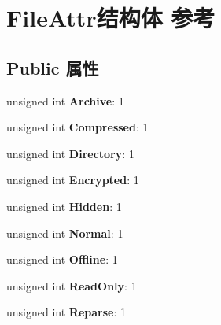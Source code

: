\hypertarget{struct_file_attr}{}\section{File\+Attr结构体 参考}
\label{struct_file_attr}
\subsection*{Public 属性}
\begin{DoxyCompactItemize}
\item 
\mbox{\label{struct_file_attr_a30e9959119e11f2c24c4fc2548688047}} 
unsigned int {\bfseries Archive}\+: 1
\item 
\mbox{\label{struct_file_attr_a1c08b9b2c14ce6c1f4360ea3cae6b5e6}} 
unsigned int {\bfseries Compressed}\+: 1
\item 
\mbox{\label{struct_file_attr_a44e6540f9d01bb250e250f70971de977}} 
unsigned int {\bfseries Directory}\+: 1
\item 
\mbox{\label{struct_file_attr_a8bd396764cdc285f31c85d743a3bd6b9}} 
unsigned int {\bfseries Encrypted}\+: 1
\item 
\mbox{\label{struct_file_attr_a5b22873632a5fc7c70e3e1d58879ab56}} 
unsigned int {\bfseries Hidden}\+: 1
\item 
\mbox{\label{struct_file_attr_a95b4d48b2684c8d3df376746f1aa2aa1}} 
unsigned int {\bfseries Normal}\+: 1
\item 
\mbox{\label{struct_file_attr_aed3eab684eaa0cf2d2a41444b5d64420}} 
unsigned int {\bfseries Offline}\+: 1
\item 
\mbox{\label{struct_file_attr_a79547e71b83cb61e8b5d633df44013aa}} 
unsigned int {\bfseries Read\+Only}\+: 1
\item 
\mbox{\label{struct_file_attr_a290c2cdbfd1ffdc2cc610f6afa6966ea}} 
unsigned int {\bfseries Reparse}\+: 1
\item 
\mbox{\label{struct_file_attr_a5adc4a5368179b1e8cfda54d416fb825}} 

\end{DoxyCompactItemize}
